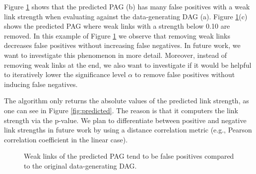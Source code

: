 \documentclass[conference]{IEEEtran}
\begin{document}
Figure \ref{fig:removed} shows that the predicted PAG (b) has many false positives with a weak link strength when evaluating against the data-generating DAG (a). Figure \ref{fig:removed}(c) shows the predicted PAG where weak links with a strength below 0.10 are removed. In this example of Figure \ref{fig:removed} we observe that removing weak links decreases false positives without increasing false negatives. In future work, we want to investigate this phenomenon in more detail. Moreover, instead of removing weak links at the end, we also want to investigate if it would be helpful to iteratively lower the significance level $\alpha$ to remove false positives without inducing false negatives.

The algorithm only returns the absolute values of the predicted link strength, as one can see in Figure \ref{fig:predicted}. The reason is that it computers the link strength via the p-value. We plan to differentiate between positive and negative link strengths in future work by using a distance correlation metric (e.g., Pearson correlation coefficient in the linear case).



\begin{figure}[htbp]
    \centering
    \caption{Weak links of the predicted PAG tend to be false positives compared to the original data-generating DAG.}
        \label{fig:removed}
\end{figure}
\end{document}
